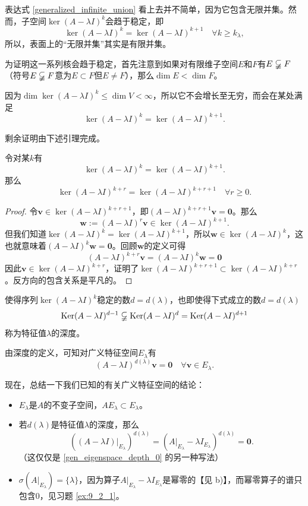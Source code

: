 表达式 \eqref{generalized_infinite_union} 看上去并不简单，因为它包含无限并集。然而，子空间$\ker (A-\lambda I)^k$会趋于稳定，即
\[\ker(A-\lambda I)^{k}=\ker(A-\lambda I)^{k+1}\quad \forall k\ge k_\lambda,\]
所以，表面上的“无限并集”其实是有限并集。

为证明这一系列核会趋于稳定，首先注意到如果对有限维子空间$E$和$F$有$E\varsubsetneqq F$（符号$E\varsubsetneqq F$意为$E\subset F$但$E\neq F$），那么$\dim E<\dim F$。

因为$\dim\ker(A-\lambda I)^k\le\dim V<\infty$，所以它不会增长至无穷，而会在某处满足
\[\ker(A-\lambda I)^k = \ker(A-\lambda I)^{k+1}.\]

剩余证明由下述引理完成。

\begin{lemma}
    令对某$k$有\[\ker(A-\lambda I)^k = \ker(A-\lambda I)^{k+1}.\]
    那么\[\ker(A-\lambda I)^{k+r} = \ker(A-\lambda I)^{k+r+1}\quad \forall r\ge 0.\]
\end{lemma}

\begin{proof}
    令$\mathbf{v}\in \ker(A-\lambda I)^{k+r+1}$，即$(A-\lambda I)^{k+r+1}\mathbf{v}=\mathbf{0}$。那么\[\mathbf{w}:=(A-\lambda I)^{r}\mathbf{v}\in\ker (A-\lambda I)^{k+1}.\]
    但我们知道$\ker (A-\lambda I)^k = \ker(A-\lambda I)^{k+1}$，所以$\mathbf{w}\in \ker(A-\lambda I)^k$，这也就意味着$(A-\lambda I)^k\mathbf{w}=\mathbf{0}$。回顾$\mathbf{w}$的定义可得\[(A-\lambda I)^{k+r}\mathbf{v}=(A-\lambda I)^k\mathbf{w}=\mathbf{0}\]
    因此$\mathbf{v}\in\ker (A-\lambda I)^{k+r}$，证明了$\ker (A-\lambda I)^{k+r+1}\subset \ker (A-\lambda I)^{k+r}$。反方向的包含关系是平凡的。
\end{proof}

\begin{definition*}
    使得序列$\ker (A-\lambda I)^{k}$稳定的数$d=d(\lambda)$，也即使得下式成立的数$d=d(\lambda)$
    \[\ker (A-\lambda I)^{d-1}\varsubsetneqq \ker (A-\lambda I)^{d} = \ker (A-\lambda I)^{d+1}\]
    称为特征值$\lambda$的深度。
\end{definition*}

由深度的定义，可知对广义特征空间$E_\lambda$有
\begin{equation}\label{gen_eigenspace_depth_0}
    (A-\lambda I)^{d(\lambda)}\mathbf{v}=\mathbf{0}\quad \forall\mathbf{v}\in E_\lambda.
\end{equation}

现在，总结一下我们已知的有关广义特征空间的结论：
\begin{itemize}
    \item[a)]  $E_\lambda$是$A$的不变子空间，$AE_\lambda \subset E_\lambda$。
    \item[b)] 若$d(\lambda)$是特征值$\lambda$的深度，那么
    \[((A-\lambda I)|_{E_\lambda})^{d(\lambda)} = (A|_{E_\lambda} - \lambda I_{E_\lambda})^{d(\lambda)} = \mathbf{0}.\]
    （这仅仅是 \eqref{gen_eigenspace_depth_0} 的另一种写法）
    \item[c)] $\sigma(A|_{E_\lambda})=\{\lambda\}$，因为算子$A|_{E_\lambda} - \lambda I_{E_\lambda}$是幂零的【见 b)】，而幂零算子的谱只包含$0$，见习题 \ref{ex:9_2_1}。
\end{itemize}


